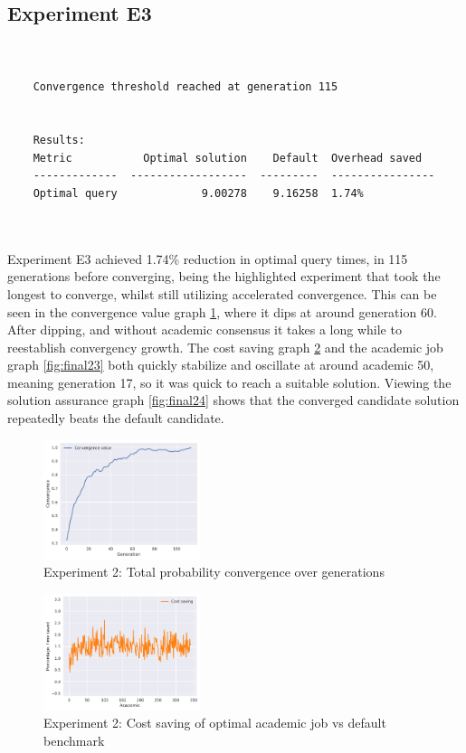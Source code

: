 \documentclass[a4paper,english]{report}
\begin{document}
	\subsection{Experiment E3}
	\begin{verbatim}
	
	
	Convergence threshold reached at generation 115
	
	
	Results:
	Metric           Optimal solution    Default  Overhead saved
	-------------  ------------------  ---------  ----------------
	Optimal query             9.00278    9.16258  1.74%

	
	\end{verbatim}
	Experiment E3 achieved 1.74\% reduction in optimal query times, in 115 generations before converging, being the highlighted experiment that took the longest to converge, whilst still utilizing accelerated convergence. This can be seen in the convergence value graph \ref{fig:final21}, where it dips at around generation 60. After dipping, and without academic consensus it takes a long while to reestablish convergency growth. The cost saving graph \ref{fig:final22} and the academic job graph \ref{fig:final23} both quickly stabilize and oscillate at around academic 50, meaning generation 17, so it was quick to reach a suitable solution. Viewing the solution assurance graph \ref{fig:final24} shows that the converged candidate solution repeatedly beats the default candidate.
	\clearpage
	\begin{figure}[H]
		\centering
		\includegraphics[width=130pt]{runlogs/final7/1}
		\caption{Experiment 2: Total probability convergence over generations}
		\label{fig:final21}
	\end{figure}
	\begin{figure}[H]
		\centering
		\includegraphics[width=130pt]{runlogs/final7/2}
		\caption{Experiment 2: Cost saving of optimal academic job vs default benchmark}
		\label{fig:final22}
	\end{figure}
\end{document}

